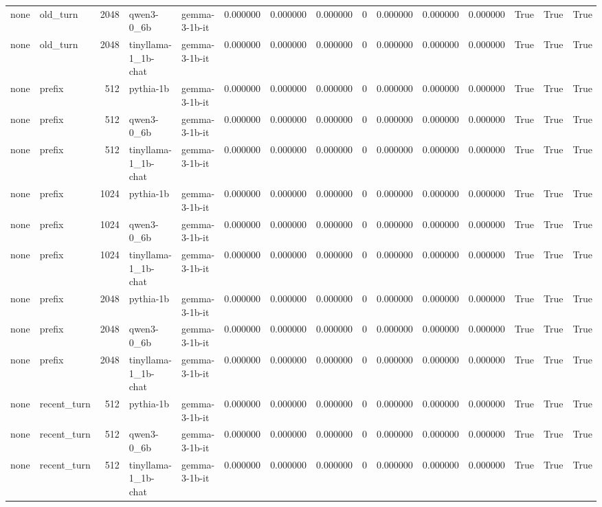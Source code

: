 \begin{tabular}{llrllrrrrrrrrrr}
none & old_turn & 2048 & qwen3-0_6b & gemma-3-1b-it & 0.000000 & 0.000000 & 0.000000 & 0 & 0.000000 & 0.000000 & 0.000000 & True & True & True \\
none & old_turn & 2048 & tinyllama-1_1b-chat & gemma-3-1b-it & 0.000000 & 0.000000 & 0.000000 & 0 & 0.000000 & 0.000000 & 0.000000 & True & True & True \\
none & prefix & 512 & pythia-1b & gemma-3-1b-it & 0.000000 & 0.000000 & 0.000000 & 0 & 0.000000 & 0.000000 & 0.000000 & True & True & True \\
none & prefix & 512 & qwen3-0_6b & gemma-3-1b-it & 0.000000 & 0.000000 & 0.000000 & 0 & 0.000000 & 0.000000 & 0.000000 & True & True & True \\
none & prefix & 512 & tinyllama-1_1b-chat & gemma-3-1b-it & 0.000000 & 0.000000 & 0.000000 & 0 & 0.000000 & 0.000000 & 0.000000 & True & True & True \\
none & prefix & 1024 & pythia-1b & gemma-3-1b-it & 0.000000 & 0.000000 & 0.000000 & 0 & 0.000000 & 0.000000 & 0.000000 & True & True & True \\
none & prefix & 1024 & qwen3-0_6b & gemma-3-1b-it & 0.000000 & 0.000000 & 0.000000 & 0 & 0.000000 & 0.000000 & 0.000000 & True & True & True \\
none & prefix & 1024 & tinyllama-1_1b-chat & gemma-3-1b-it & 0.000000 & 0.000000 & 0.000000 & 0 & 0.000000 & 0.000000 & 0.000000 & True & True & True \\
none & prefix & 2048 & pythia-1b & gemma-3-1b-it & 0.000000 & 0.000000 & 0.000000 & 0 & 0.000000 & 0.000000 & 0.000000 & True & True & True \\
none & prefix & 2048 & qwen3-0_6b & gemma-3-1b-it & 0.000000 & 0.000000 & 0.000000 & 0 & 0.000000 & 0.000000 & 0.000000 & True & True & True \\
none & prefix & 2048 & tinyllama-1_1b-chat & gemma-3-1b-it & 0.000000 & 0.000000 & 0.000000 & 0 & 0.000000 & 0.000000 & 0.000000 & True & True & True \\
none & recent_turn & 512 & pythia-1b & gemma-3-1b-it & 0.000000 & 0.000000 & 0.000000 & 0 & 0.000000 & 0.000000 & 0.000000 & True & True & True \\
none & recent_turn & 512 & qwen3-0_6b & gemma-3-1b-it & 0.000000 & 0.000000 & 0.000000 & 0 & 0.000000 & 0.000000 & 0.000000 & True & True & True \\
none & recent_turn & 512 & tinyllama-1_1b-chat & gemma-3-1b-it & 0.000000 & 0.000000 & 0.000000 & 0 & 0.000000 & 0.000000 & 0.000000 & True & True & True \\

\end{tabular}
